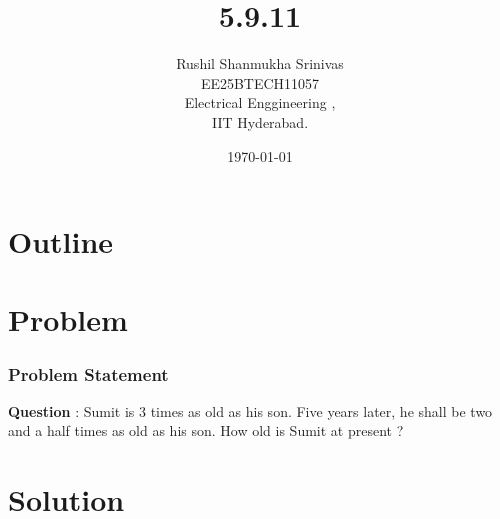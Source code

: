 \documentclass{beamer}
\title{5.9.11}
\author{Rushil Shanmukha Srinivas \\EE25BTECH11057 \\ Electrical Enggineering ,\\IIT Hyderabad.}
\date{\today}
\theoremstyle{remark}
\numberwithin{equation}{section}
\begin{document}
 

\begin{frame}
\titlepage
\end{frame}

\section*{Outline}
\begin{frame}
\tableofcontents
\end{frame}
\section{Problem}
\begin{frame}
\frametitle{Problem Statement}
\textbf{Question} : 
Sumit is 3 times as old as his son. Five years later, he shall be two and a half times as old as his son. How old is Sumit at present ?
\end{frame}
\section{Solution}
\end{document}
